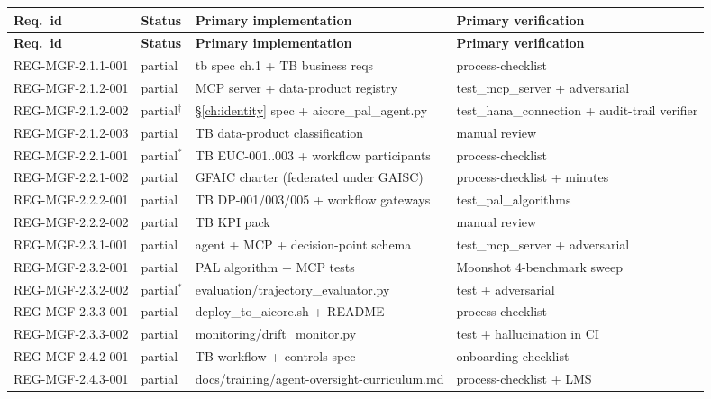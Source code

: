 \footnotesize
\setlength{\tabcolsep}{4pt}
\begin{longtable}{p{3.5cm}p{1.6cm}p{4.6cm}p{3.6cm}}
\toprule
\textbf{Req.\ id} & \textbf{Status} & \textbf{Primary implementation} & \textbf{Primary verification} \\
\midrule
\endfirsthead
\toprule
\textbf{Req.\ id} & \textbf{Status} & \textbf{Primary implementation} & \textbf{Primary verification} \\
\midrule
\endhead
REG-MGF-2.1.1-001 & partial       & tb spec ch.1 + TB business reqs             & process-checklist \\
REG-MGF-2.1.2-001 & partial       & MCP server + data-product registry          & test\_mcp\_server + adversarial \\
REG-MGF-2.1.2-002 & partial$^\dagger$ & \S\ref{ch:identity} spec + aicore\_pal\_agent.py & test\_hana\_connection + audit-trail verifier \\
REG-MGF-2.1.2-003 & partial       & TB data-product classification              & manual review \\
REG-MGF-2.2.1-001 & partial$^*$   & TB EUC-001..003 + workflow participants     & process-checklist \\
REG-MGF-2.2.1-002 & partial       & GFAIC charter (federated under GAISC)       & process-checklist + minutes \\
REG-MGF-2.2.2-001 & partial       & TB DP-001/003/005 + workflow gateways       & test\_pal\_algorithms \\
REG-MGF-2.2.2-002 & partial       & TB KPI pack                                 & manual review \\
REG-MGF-2.3.1-001 & partial       & agent + MCP + decision-point schema         & test\_mcp\_server + adversarial \\
REG-MGF-2.3.2-001 & partial       & PAL algorithm + MCP tests                   & Moonshot 4-benchmark sweep \\
REG-MGF-2.3.2-002 & partial$^*$   & evaluation/trajectory\_evaluator.py         & test + adversarial \\
REG-MGF-2.3.3-001 & partial       & deploy\_to\_aicore.sh + README              & process-checklist \\
REG-MGF-2.3.3-002 & partial       & monitoring/drift\_monitor.py                & test + hallucination in CI \\
REG-MGF-2.4.2-001 & partial       & TB workflow + controls spec                 & onboarding checklist \\
REG-MGF-2.4.3-001 & partial       & docs/training/agent-oversight-curriculum.md & process-checklist + LMS \\

\end{longtable}

